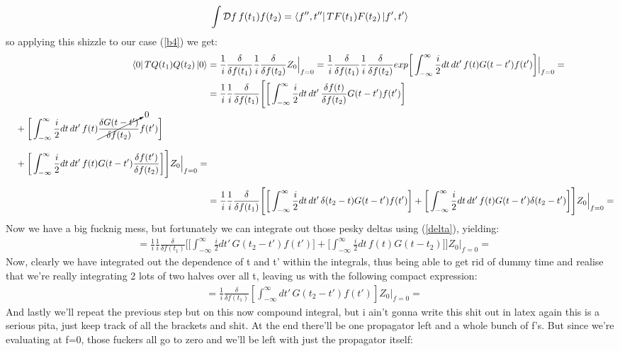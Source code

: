 \documentclass[10pt]{article}
\begin{document}
\begin{align}
	\int \mathcal{D}f\, f(t_1)f(t_2) = \bra{f'',t''}TF(t_1)F(t_2)\ket{f',t'}
\end{align}
so applying this shizzle to our case (\ref{b4}) we get:
\begin{align}
\bra{0}TQ(t_1)Q(t_2)\ket{0} &= \frac{1}{i} \frac{\delta}{\delta f(t_1)} \frac{1}{i} \frac{\delta}{\delta f(t_2)} Z_0 \Big\rvert_{f=0} = \frac{1}{i} \frac{\delta}{\delta f(t_1)} \frac{1}{i} \frac{\delta}{\delta f(t_2)}exp \bigg[\int_{-\infty}^{\infty}\frac{i}{2}dt\,dt'\,f(t)G(t-t')f(t')\bigg] \Big\rvert_{f=0}= \\
			    &=   \frac{1}{i}\frac{1}{i} \frac{\delta}{\delta f(t_1)}  \Bigg[\bigg[\int_{-\infty}^{\infty}\frac{i}{2}dt\,dt'\,\frac{\delta f(t)}{\delta f(t_2)}G(t-t')f(t')\bigg] \nonumber\\ \begin{split}&\quad + \bigg[\int_{-\infty}^{\infty}\frac{i}{2}dt\,dt'\,f(t)\cancelto{0}{\frac{\delta G(t-t')}{\delta f(t_2)}}f(t')\bigg] \\[1.5ex] &\quad + \bigg[\int_{-\infty}^{\infty}\frac{i}{2}dt\,dt'\,f(t)G(t-t')\frac{\delta f(t')}{\delta f(t_2)}\bigg] \Bigg] Z_0 \Big\rvert_{f=0}=  \end{split} \\[1.5ex]
			    &= \frac{1}{i}\frac{1}{i} \frac{\delta}{\delta f(t_1)}  \Bigg[\bigg[\int_{-\infty}^{\infty}\frac{i}{2}dt\,dt'\,\delta(t_2-t)G(t-t')f(t')\bigg] + \bigg[\int_{-\infty}^{\infty}\frac{i}{2}dt\,dt'\,f(t)G(t-t')\delta(t_2-t')\bigg] \Bigg] Z_0 \Big\rvert_{f=0}=
\end{align}
Now we have a big fucknig mess, but fortunately we can integrate out those pesky deltas using (\ref{delta}), yielding:
\begin{align}
			    &= \frac{1}{i}\frac{1}{i} \frac{\delta}{\delta f(t_1)}  \Bigg[\bigg[\int_{-\infty}^{\infty}\frac{i}{2}dt'\,G(t_2-t')f(t')\bigg] + \bigg[\int_{-\infty}^{\infty}\frac{i}{2}dt\,f(t)G(t-t_2)\bigg] \Bigg] Z_0 \Big\rvert_{f=0}= 
\end{align}
Now, clearly we have integrated out the dependence of t and t' within the integrals, thus being able to get rid of dummy time and realise that we're really integrating 2 lots of two halves over all t, leaving us with the following compact expression:
\begin{align}
			    &= \frac{1}{i} \frac{\delta}{\delta f(t_1)} \left[ \int_{-\infty}^{\infty}dt'\,G(t_2-t')f(t') \right] Z_0 \Big\rvert_{f=0}=
\end{align}
And lastly we'll repeat the previous step but on this now compound integral, but i ain't gonna write this shit out in latex again this is a serious pita, just keep track of all the brackets and shit. At the end there'll be one propagator left and a whole bunch of f's. But since we're evaluating at f=0, those fuckers all go to zero and we'll be left with just the propagator itself:
\end{document}
